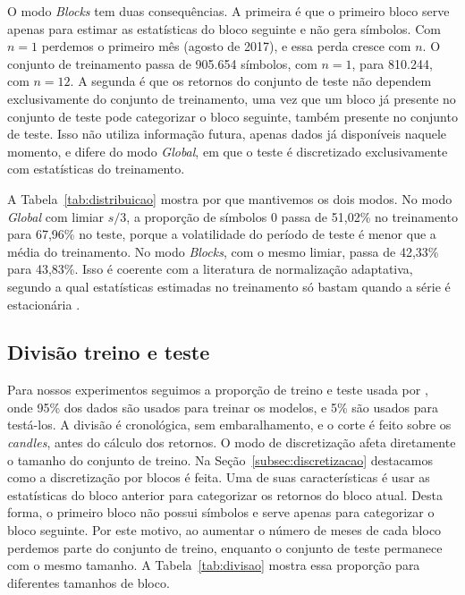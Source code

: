 \documentclass[
    12pt,                %
    openright,           %
    oneside,             %
    a4paper,             %
    english,             %
    brazil               %
]{abntex2}
\begin{document}
O modo \textit{Blocks} tem duas consequências. A primeira é que o primeiro bloco serve apenas para estimar as estatísticas do bloco 
seguinte e não gera símbolos. Com $n = 1$ perdemos o primeiro mês (agosto de 2017), e essa perda cresce com $n$. O conjunto de 
treinamento passa de 905.654 símbolos, com $n = 1$, para 810.244, com $n = 12$. A segunda é que os retornos do conjunto de teste 
não dependem exclusivamente do conjunto de treinamento, uma vez que um bloco já presente no conjunto de teste pode categorizar 
o bloco seguinte, também presente no conjunto de teste. Isso não utiliza informação futura, apenas dados já disponíveis naquele 
momento, e difere do modo \textit{Global}, em que o teste é discretizado exclusivamente com estatísticas do treinamento.

A Tabela~\ref{tab:distribuicao} mostra 
por que mantivemos os dois modos. No modo \textit{Global} com limiar $s/3$, a proporção de símbolos 0 passa de 51,02\% no 
treinamento para 67,96\% no teste, porque a volatilidade do período de teste é menor que a média do treinamento. No modo 
\textit{Blocks}, com o mesmo limiar, passa de 42,33\% para 43,83\%. Isso é coerente com a literatura de normalização adaptativa, 
segundo a qual estatísticas estimadas no treinamento só bastam quando a série é estacionária \cite{URETTINI2024}.

\subsection{Divisão treino e teste}
\label{subsec:divisao}

Para nossos experimentos seguimos a proporção de treino e teste usada por , onde 95\% dos dados são usados para 
treinar os modelos, e 5\% são usados para testá-los. A divisão é cronológica, sem embaralhamento, e o corte é feito sobre os
\textit{candles}, antes do cálculo dos retornos. O modo de discretização afeta diretamente o tamanho do conjunto de treino.
Na Seção~\ref{subsec:discretizacao} destacamos como a discretização por blocos é feita. Uma de suas características é usar as
estatísticas do bloco anterior para categorizar os retornos do bloco atual. Desta forma, o primeiro bloco não possui símbolos e
serve apenas para categorizar o bloco seguinte. Por este motivo, ao aumentar o número de meses de cada bloco perdemos parte do
conjunto de treino, enquanto o conjunto de teste permanece com o mesmo tamanho. A Tabela~\ref{tab:divisao} mostra essa proporção
para diferentes tamanhos de bloco.
\end{document}

